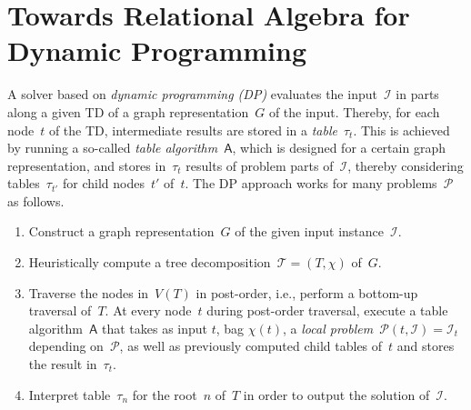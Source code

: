 \documentclass{llncs}
\newcommand{\TTT}{\mathcal{T}}
\newcommand{\algo}[1]{\ensuremath{\mathsf{#1}}}
\newcommand{\tab}[1]{\ensuremath{\tau_{#1}}}
\begin{document}
\section{Towards Relational Algebra for Dynamic Programming}
A solver based on \emph{dynamic programming (DP)} %
evaluates the input~$\mathcal{I}$ in parts along a given TD of a graph representation~$G$
of the input.
Thereby, for each node~$t$ of the TD, intermediate results are %
stored in a \emph{table}~$\tab{t}$. %
This is achieved by running a so-called \emph{table algorithm}~$\algo{A}$,
which is designed for a certain graph representation, 
and stores in~$\tab{t}$ results of problem parts of~$\mathcal{I}$,
thereby considering tables~$\tab{t'}$ for child nodes~$t'$ of~$t$. %
%
The DP approach works for many problems~$\mathcal{P}$ as follows. %
\begin{enumerate}%
\item Construct a graph representation~$G$ of the given input instance~$\mathcal{I}$.
\item Heuristically compute a tree decomposition~$\TTT=(T,\chi)$ of~$G$.
\item\label{step:dp} Traverse the nodes in~$V(T)$ in
  post-order, i.e., perform a bottom-up traversal of~$T$.
  At every node~$t$ during post-order traversal, execute a table algorithm~$\algo{A}$ 
  that takes as input $t$, bag $\chi(t)$, a \emph{local problem}~$\mathcal{P}(t,\mathcal{I})=\mathcal{I}_t$ depending on~$\mathcal{P}$, as well as previously computed child tables of~$t$ and stores the result in~$\tab{t}$.
\item Interpret table~$\tab{n}$ for the root~$n$ of~$T$ in order to output the solution of~$\mathcal{I}$.
\end{enumerate}
\end{document}
